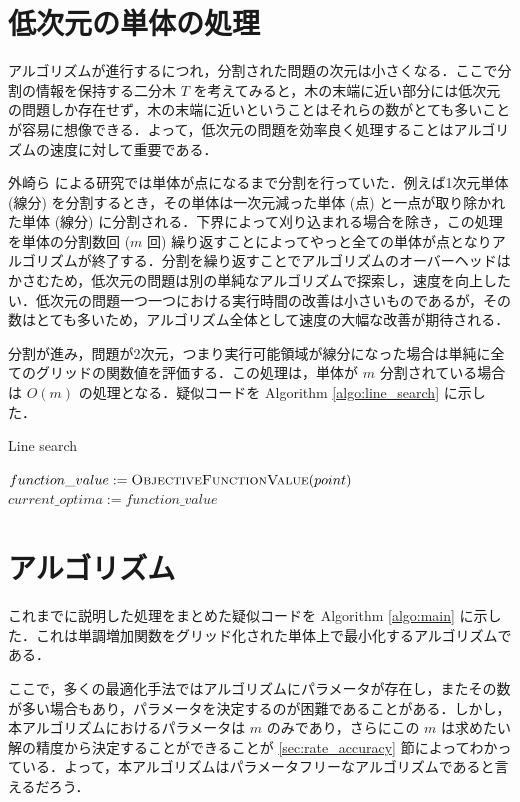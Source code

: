 \documentclass[a4paper,11pt]{jreport}
\begin{document}
\section{低次元の単体の処理}

アルゴリズムが進行するにつれ，分割された問題の次元は小さくなる．ここで分割の情報を保持する二分木 $ T $ を考えてみると，木の末端に近い部分には低次元の問題しか存在せず，木の末端に近いということはそれらの数がとても多いことが容易に想像できる．よって，低次元の問題を効率良く処理することはアルゴリズムの速度に対して重要である．\par
外崎ら \cite{tonosaki} による研究では単体が点になるまで分割を行っていた．例えば1次元単体 (線分) を分割するとき，その単体は一次元減った単体 (点) と一点が取り除かれた単体 (線分) に分割される．下界によって刈り込まれる場合を除き，この処理を単体の分割数回 ($ m $ 回) 繰り返すことによってやっと全ての単体が点となりアルゴリズムが終了する．分割を繰り返すことでアルゴリズムのオーバーヘッドはかさむため，低次元の問題は別の単純なアルゴリズムで探索し，速度を向上したい．低次元の問題一つ一つにおける実行時間の改善は小さいものであるが，その数はとても多いため，アルゴリズム全体として速度の大幅な改善が期待される．\par
分割が進み，問題が2次元，つまり実行可能領域が線分になった場合は単純に全てのグリッドの関数値を評価する．この処理は，単体が $ m $ 分割されている場合は $ O(m) $ の処理となる．疑似コードを Algorithm \ref{algo:line_search} に示した．\par

\begin{algorithm}
\caption{Line search}
\label{algo:line_search}
\begin{algorithmic}[1]
\State $ function\_value := \Call{ObjectiveFunctionValue}{point} $
\State $current\_optima := function\_value $
\EndIf
\EndFor
\EndFunction
\end{algorithmic}
\end{algorithm}

\section{アルゴリズム}

これまでに説明した処理をまとめた疑似コードを Algorithm \ref{algo:main} に示した．これは単調増加関数をグリッド化された単体上で最小化するアルゴリズムである．\par
ここで，多くの最適化手法ではアルゴリズムにパラメータが存在し，またその数が多い場合もあり，パラメータを決定するのが困難であることがある．しかし，本アルゴリズムにおけるパラメータは $ m $ のみであり，さらにこの $ m $ は求めたい解の精度から決定することができることが \ref{sec:rate_accuracy} 節によってわかっている．よって，本アルゴリズムはパラメータフリーなアルゴリズムであると言えるだろう．\par
\end{document}
